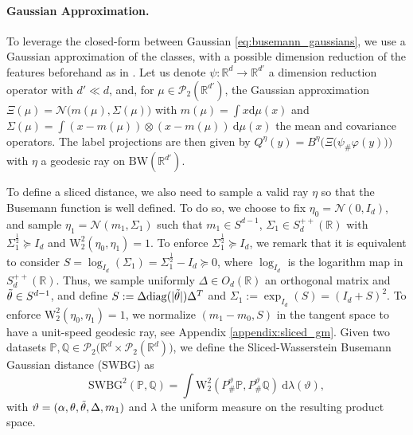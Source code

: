 \documentclass[twoside]{article}
\newcommand{\cP}{\mathcal{P}}
\newcommand{\bP}{\mathbb{P}}
\newcommand{\bQ}{\mathbb{Q}}
\newcommand{\cN}{\mathcal{N}}
\newcommand{\cPProd}[1]{\mathcal{P}_2\big(#1 \times \cP_2(#1)\big)}
\newcommand{\W}{\mathrm{W}}
\newcommand{\R}{\mathbb{R}}
\newcommand{\bw}{\mathrm{BW}}
\newcommand{\swbg}{\mathrm{SWBG}}
\begin{document}
\paragraph{Gaussian Approximation.}

 To leverage the closed-form between Gaussian \eqref{eq:busemann_gaussians}, we use a Gaussian approximation of the classes, with a possible dimension reduction of the features beforehand as in \citep{hua2023dynamic}. Let us denote $\psi:\R^d\to\R^{d'}$ a dimension reduction operator with $d'\ll d$, and, for $\mu\in\cP_2(\R^{d'})$, the Gaussian approximation $\Xi(\mu)=\cN\big(m(\mu),\Sigma(\mu)\big)$ with $m(\mu)=\int x\mathrm{d}\mu(x)$ and $\Sigma(\mu)=\int (x-m(\mu))\otimes (x-m(\mu))\ \mathrm{d}\mu(x)$ the mean and covariance operators. The label projections are then given by $Q^\eta(y) = B^\eta\big(\Xi\big(\psi_\#\varphi(y)\big)\big)$ with $\eta$ a geodesic ray on $\bw(\R^{d'})$.

To define a sliced distance, we also need to sample a valid ray $\eta$ so that the Busemann function is well defined. To do so, we choose to fix $\eta_0=\cN(0,I_d)$, and sample $\eta_1=\cN(m_1,\Sigma_1)$ such that $m_1\in S^{d-1}$, $\Sigma_1\in S_d^{++}(\R)$ with $\Sigma_1^{\frac12}\succeq I_d$ and $\W_2^2(\eta_0, \eta_1)=1$. To enforce $\Sigma_1^{\frac12}\succeq I_d$, we remark that it is equivalent to consider $S=\log_{I_d}(\Sigma_1) = \Sigma_1^{\frac12} - I_d \succeq 0$, where $\log_{I_d}$ is the logarithm map in $S_d^{++}(\R)$. Thus, we sample uniformly $\Delta\in O_d(\R)$ an orthogonal matrix and $\Tilde{\theta}\in S^{d-1}$, and define $S:=\Delta\mathrm{diag}(|\Tilde{\theta}|)\Delta^T$ and $\Sigma_1:=\exp_{I_d}(S) = (I_d+S)^2$. To enforce $\W_2^2(\eta_0,\eta_1)=1$, we normalize $(m_1-m_0, S)$ in the tangent space to have a unit-speed geodesic ray, see Appendix \ref{appendix:sliced_gm}. Given two datasets $\bP,\bQ\in\cPProd{\R^d}$, we define the Sliced-Wasserstein Busemann Gaussian distance ($\swbg$) as
\begin{equation}
    \swbg^2(\bP,\bQ) = \int \W_2^2(P^\vartheta_\#\bP,P^\vartheta_\#\bQ)\ \mathrm{d}\lambda(\vartheta),
\end{equation}
with $\vartheta = (\alpha,\theta, \Tilde{\theta}, \Delta, m_1)$ and $\lambda$ the uniform measure on the resulting product space.
\end{document}
